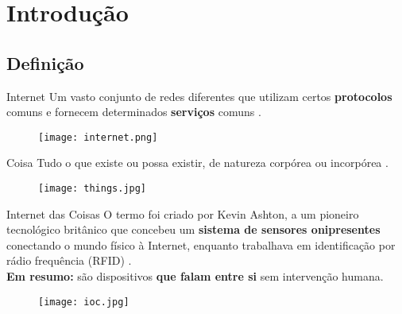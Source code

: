 \section{Introdução}
\label{sec:introducao}

\subsection*{Definição}
\begin{frame}{}
	\begin{block}{Internet}	
		Um vasto conjunto de redes diferentes que utilizam certos \textbf{protocolos} comuns e fornecem determinados \textbf{serviços} comuns \cite{tanenbaum2011computer}. 
	\end{block}
	
	\begin{figure}[H]
		\texttt{[image: internet.png]}\footnotemark
	\end{figure}
	
\end{frame}

\begin{frame}{}
	\begin{block}{Coisa}	
		Tudo o que existe ou possa existir, de natureza corpórea ou incorpórea \cite{Michaelis}.
	\end{block}
	
	\begin{figure}[H]
		\texttt{[image: things.jpg]}\footnotemark
	\end{figure}
	
\end{frame}

\begin{frame}{}	
	\begin{block}{Internet das Coisas}		
		O termo foi criado por Kevin Ashton, a um pioneiro tecnológico britânico que concebeu um \textbf{sistema de sensores onipresentes} conectando o mundo físico à Internet, enquanto trabalhava em identificação por rádio frequência (RFID) \cite{Amazon}.\\ 
		\vspace{4pt}
		\textbf{Em resumo:} são dispositivos \textbf{que falam entre si} sem intervenção humana.
	\end{block}
	
	\begin{figure}[H]
		\texttt{[image: ioc.jpg]}\footnotemark
	\end{figure}
	
\end{frame}

